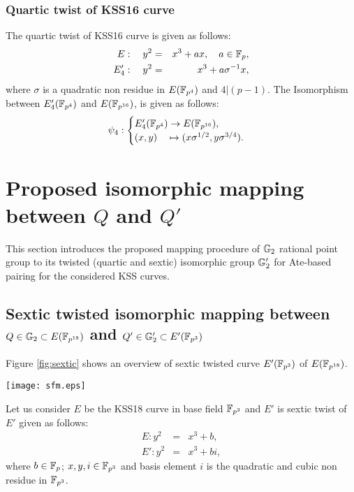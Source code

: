 \subsubsection{Quartic twist of KSS16 curve}
The quartic twist of KSS16 curve is given as  follows:
\begin{eqnarray}
E:  \quad y^2 & = & x^3+ax, \quad a \in {\mathbb{F}}_{p}, \\
E'_4: \quad y^2 & =  & x^3+a\sigma^{-1}x,
\end{eqnarray}  
where $\sigma$ is a quadratic non residue in $E({\mathbb{F}}_{p^{4}})$ and $4|(p-1)$.  The Isomorphism between $E'_4({\mathbb{F}}_{p^{4}})$ and $E({\mathbb{F}}_{p^{16}})$, is given as follows:
\begin{eqnarray}
\psi_4 : \begin{cases}
E'_4({\mathbb{F}}_{p^{4}}) \rightarrow E({\mathbb{F}}_{p^{16}}),\\
(x,y) \quad \mapsto (x\sigma^{1/2},y\sigma^{3/4}).
\end{cases}
\end{eqnarray}

\section{Proposed isomorphic mapping between $Q$ and $Q'$}
This section introduces the proposed  mapping procedure of ${\mathbb{G}}_{2}$ rational point group to its twisted (quartic and  sextic) isomorphic group ${\mathbb{G}}_{2}'$ for Ate-based pairing for the considered KSS curves. 

\subsection{Sextic twisted isomorphic mapping between $Q \in {\mathbb{G}}_{2} \subset E(\mathbb{F}_{p^{18}})$ and $Q' \in {\mathbb{G}}_{2}' \subset E'(\mathbb{F}_{p^3})$}
Figure \ref{fig:sextic} shows an overview of sextic twisted curve $E'(\mathbb{F}_{p^3})$ of $E(\mathbb{F}_{p^{18}})$.
\begin{figure*}
\centering
\texttt{[image: sfm.eps]}
\caption{\textit{sextic twist} in KSS18 curve.}
\label{fig:sextic}
\end{figure*}

Let us consider $E$ be the KSS18 curve in base field $\mathbb{F}_{p^3}$  and $E'$ is sextic twist of $E'$ given as follows: 
\begin{eqnarray}
E:y^2 & = &x^3+b,\\
E':y^2 & = & x^3+bi, \label{eq:KSS_Twist}
\end{eqnarray}
where $b \in {\mathbb{F}}_{p}$; $x, y, i \in \mathbb{F}_{p^3}$ and basis element $i$ is the quadratic and cubic non residue in $\mathbb{F}_{p^3}$.

